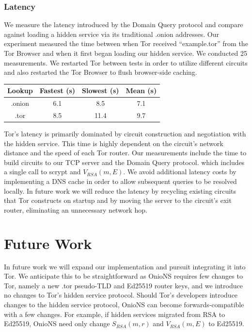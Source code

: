 \documentclass{sig-alternate}
\begin{document}
\subsubsection{Latency}

We measure the latency introduced by the Domain Query protocol and compare against loading a hidden service via its traditional .onion addresses. Our experiment measured the time between when Tor received ``example.tor'' from the Tor Browser and when it first began loading our hidden service. We conducted 25 measurements. We restarted Tor between tests in order to utilize different circuits and also restarted the Tor Browser to flush browser-side caching.

\renewcommand{\arraystretch}{1}
\begin{center}
    \begin{tabular}{ | c | c | c | c |}
    \hline
    \textbf{Lookup} & \textbf{Fastest (s)} & \textbf{Slowest (s)} & \textbf{Mean (s)} \\
    \hline
    .onion & 6.1 & 8.5 & 7.1 \\ \hline
	.tor & 8.5 & 11.4 & 9.7 \\
	\hline
    \end{tabular}
\end{center}

Tor's latency is primarily dominated by circuit construction and negotiation with the hidden service. This time is highly dependent on the circuit's network distance and the speed of each Tor router. Our measurements include the time to build circuits to our TCP server and the Domain Query protocol. which includes a single call to scrypt and $ V_{\mathit{RSA}}(m, E) $. We avoid additional latency costs by implementing a DNS cache in order to allow subsequent queries to be resolved locally. In future work we will reduce the latency by recycling existing circuits that Tor constructs on startup and by moving the server to the circuit's exit router, eliminating an unnecessary network hop.

\section{Future Work}

In future work we will expand our implementation and pursuit integrating it into Tor. We anticipate this to be straightforward as OnioNS requires few changes to Tor, namely a new .tor pseudo-TLD and Ed25519 router keys, and we introduce no changes to Tor's hidden service protocol. Should Tor's developers introduce changes to the hidden service protocol, OnioNS can become forwards-compatible with a few changes. For example, if hidden services migrated from RSA to Ed25519, OnioNS need only change $ S_{\mathit{RSA}}(m, r) $ and $ V_{\mathit{RSA}}(m, E) $ to Ed25519.
\end{document}
